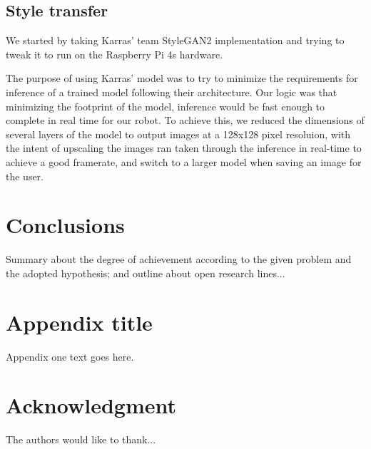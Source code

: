 \documentclass[journal,onecolumn]{IEEEtran}
\begin{document}
\subsection{Style transfer}

We started by taking Karras' team StyleGAN2 implementation and trying to tweak it to run on the Raspberry Pi 4s hardware. 


The purpose of using Karras' model was to try to minimize the requirements for inference of a trained model following their architecture. Our logic was that minimizing the footprint of the model, inference would be fast enough to complete in real time for our robot. To achieve this, we reduced the dimensions of several layers of the model to output images at a 128x128 pixel resoluion, with the intent of upscaling the images ran taken through the inference in real-time to achieve a good framerate, and switch to a larger model when saving an image for the user. 

\section{Conclusions}

Summary about the degree of achievement according to the given problem and the adopted hypothesis; and outline about open research lines...


\appendices
\section{Appendix title}
Appendix one text goes here.


\section*{Acknowledgment}


The authors would like to thank...


\ifCLASSOPTIONcaptionsoff
  \newpage
\fi



\end{document}

